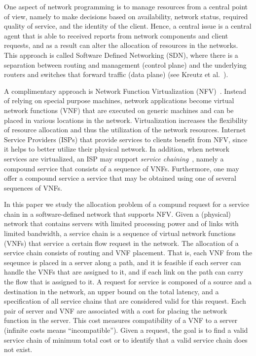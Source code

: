 \documentclass[runningheads]{llncs}
\begin{document}
One aspect of network programming is to manage resources from a
central point of view, namely to make decisions based on availability,
network status, required quality of service, and the identity of the
client.  Hence, a central issue is a central agent that is able to
received reports from network components and client requests, and as a
result can alter the allocation of resources in the networks.  This
approach is called Software Defined Networking (SDN), where there is a
separation between routing and management (control plane) and the
underlying routers and switches that forward traffic (data plane) (see
Kreutz et al.~\cite{KRVRAU15}).

A complimentary approach is Network Function Virtualization
(NFV)~\cite{NFV12}.  Instead of relying on special purpose machines,
network applications become virtual network functions (VNF) that are
executed on generic machines and can be placed in various locations in
the network.  Virtualization increases the flexibility of resource
allocation and thus the utilization of the network resources.
%
Internet Service Providers (ISPs) that provide services to clients
benefit from NFV, since it helps to better utilize their physical
network.  In addition, when network services are virtualized, an ISP
may support \emph{service chaining}~\cite{ServiceChaining15}, namely a
compound service that consists of a sequence of VNFs.  Furthermore,
one may offer a compound service a service that may be obtained using
one of several sequences of VNFs.

In this paper we study the allocation problem of a compund request for
a service chain in a software-defined network that supports NFV.
Given a (physical) network that contains servers with limited
processing power and of links with limited bandwidth, a service chain
is a sequence of virtual network functions (VNFs) that service a
certain flow request in the network.
%
The allocation of a service chain consists of routing and VNF
placement.  That is, each VNF from the seqeunce is placed in a server
along a path, and it is feasible if each server can handle the VNFs
that are assigned to it, and if each link on the path can carry the
flow that is assigned to it.
%
A request for service is composed of a source and a destination in the
network, an upper bound on the total latency, and a specification of
all service chains that are considered valid for this request.
%
Each pair of server and VNF are associated with a cost for placing the
network function in the server.  This cost measures compatibility of a
VNF to a server (infinite costs means ``incompatible'').  Given a
request, the goal is to find a valid service chain of minimum total
cost or to identify that a valid service chain does not exist.
\end{document}
